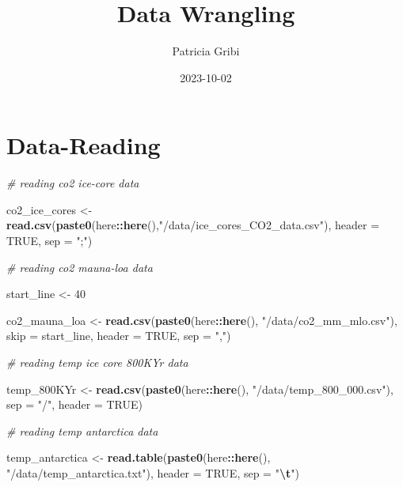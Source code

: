 \documentclass[
]{article}
\title{Data Wrangling}
\author{Patricia Gribi}
\date{2023-10-02}
\newenvironment{Shaded}{\begin{snugshade}}{\end{snugshade}}
\newcommand{\AttributeTok}[1]{\textcolor[rgb]{0.13,0.29,0.53}{#1}}
\newcommand{\CommentTok}[1]{\textcolor[rgb]{0.56,0.35,0.01}{\textit{#1}}}
\newcommand{\ConstantTok}[1]{\textcolor[rgb]{0.56,0.35,0.01}{#1}}
\newcommand{\DecValTok}[1]{\textcolor[rgb]{0.00,0.00,0.81}{#1}}
\newcommand{\FunctionTok}[1]{\textcolor[rgb]{0.13,0.29,0.53}{\textbf{#1}}}
\newcommand{\NormalTok}[1]{#1}
\newcommand{\OtherTok}[1]{\textcolor[rgb]{0.56,0.35,0.01}{#1}}
\newcommand{\SpecialCharTok}[1]{\textcolor[rgb]{0.81,0.36,0.00}{\textbf{#1}}}
\newcommand{\StringTok}[1]{\textcolor[rgb]{0.31,0.60,0.02}{#1}}
\begin{document}
\maketitle

\hypertarget{data-reading}{%
\section{Data-Reading}\label{data-reading}}

\begin{Shaded}
\begin{Highlighting}[]
\CommentTok{\# reading co2 ice{-}core data}

\NormalTok{co2\_ice\_cores }\OtherTok{\textless{}{-}} \FunctionTok{read.csv}\NormalTok{(}\FunctionTok{paste0}\NormalTok{(here}\SpecialCharTok{::}\FunctionTok{here}\NormalTok{(),}\StringTok{"/data/ice\_cores\_CO2\_data.csv"}\NormalTok{), }\AttributeTok{header =} \ConstantTok{TRUE}\NormalTok{, }\AttributeTok{sep =} \StringTok{";"}\NormalTok{)}

\CommentTok{\# reading co2 mauna{-}loa data}

\NormalTok{start\_line }\OtherTok{\textless{}{-}} \DecValTok{40}

\NormalTok{co2\_mauna\_loa }\OtherTok{\textless{}{-}} \FunctionTok{read.csv}\NormalTok{(}\FunctionTok{paste0}\NormalTok{(here}\SpecialCharTok{::}\FunctionTok{here}\NormalTok{(), }\StringTok{"/data/co2\_mm\_mlo.csv"}\NormalTok{), }\AttributeTok{skip =}\NormalTok{ start\_line, }\AttributeTok{header =} \ConstantTok{TRUE}\NormalTok{, }\AttributeTok{sep =} \StringTok{","}\NormalTok{) }

\CommentTok{\# reading temp ice core 800KYr data}

\NormalTok{temp\_800KYr }\OtherTok{\textless{}{-}} \FunctionTok{read.csv}\NormalTok{(}\FunctionTok{paste0}\NormalTok{(here}\SpecialCharTok{::}\FunctionTok{here}\NormalTok{(), }\StringTok{"/data/temp\_800\_000.csv"}\NormalTok{), }\AttributeTok{sep =} \StringTok{"/"}\NormalTok{, }\AttributeTok{header =} \ConstantTok{TRUE}\NormalTok{)}

\CommentTok{\# reading temp antarctica data}

\NormalTok{temp\_antarctica }\OtherTok{\textless{}{-}} \FunctionTok{read.table}\NormalTok{(}\FunctionTok{paste0}\NormalTok{(here}\SpecialCharTok{::}\FunctionTok{here}\NormalTok{(), }\StringTok{"/data/temp\_antarctica.txt"}\NormalTok{), }\AttributeTok{header =} \ConstantTok{TRUE}\NormalTok{, }\AttributeTok{sep =} \StringTok{"}\SpecialCharTok{\textbackslash{}t}\StringTok{"}\NormalTok{)}


\end{Highlighting}
\end{Shaded}
\end{document}
